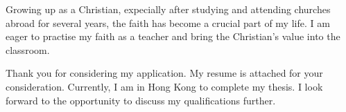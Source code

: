 \documentclass[11pt, a4paper]{awesome-cv}
\begin{document}
\begin{cvletter}
Growing up as a Christian, expecially after studying and attending churches abroad for several years, the faith has become a crucial part of my life. I am eager to practise my faith as a teacher and bring the Christian's value into the classroom.

Thank you for considering my application. My resume is attached for your consideration. Currently, I am in Hong Kong to complete my thesis. I look forward to the opportunity to discuss my qualifications further.




\end{cvletter}


\makeletterclosing
\end{document}

